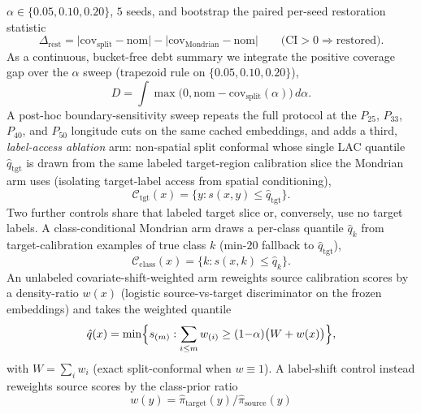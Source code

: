 \documentclass[preprint,11pt,authoryear]{elsarticle}
\begin{document}
$\alpha\in\{0.05,0.10,0.20\}$, $5$ seeds, and bootstrap the paired per-seed restoration statistic
\begin{equation}
\label{eq:restoration}
\Delta_{\mathrm{rest}}
=\bigl|\mathrm{cov}_{\mathrm{split}}-\mathrm{nom}\bigr|
-\bigl|\mathrm{cov}_{\mathrm{Mondrian}}-\mathrm{nom}\bigr|
\qquad\bigl(\mathrm{CI}{>}0\Rightarrow\text{restored}\bigr).
\end{equation}
As a continuous, bucket-free debt summary we integrate the positive coverage gap over the $\alpha$ sweep
(trapezoid rule on $\{0.05,0.10,0.20\}$),
\begin{equation}
\label{eq:debt}
D=\int \max\bigl(0,\mathrm{nom}-\mathrm{cov}_{\mathrm{split}}(\alpha)\bigr)\,d\alpha.
\end{equation}
A post-hoc boundary-sensitivity sweep repeats the full protocol at the
$P_{25}$, $P_{33}$, $P_{40}$, and $P_{50}$ longitude
cuts on the same cached embeddings, and adds a third, \emph{label-access ablation} arm: non-spatial split
conformal whose single LAC quantile $\hat q_{\mathrm{tgt}}$ is drawn from the same labeled target-region
calibration slice the Mondrian arm uses (isolating target-label access from spatial conditioning),
\begin{equation}
\label{eq:target-cal}
\mathcal{C}_{\mathrm{tgt}}(x)
=\bigl\{y:s(x,y)\le\hat q_{\mathrm{tgt}}\bigr\}.
\end{equation}
Two further controls share that labeled target slice or, conversely, use no target labels.
A class-conditional Mondrian arm draws a per-class quantile $\hat q_k$ from target-calibration examples of
true class $k$ (min-$20$ fallback to $\hat q_{\mathrm{tgt}}$),
\begin{equation}
\label{eq:class-mondrian}
\mathcal{C}_{\mathrm{class}}(x)
=\bigl\{k:s(x,k)\le\hat q_k\bigr\}.
\end{equation}
An unlabeled covariate-shift-weighted arm \citep{tibshirani2019covariate} reweights source calibration
scores by a density-ratio $w(x)$ (logistic source-vs-target discriminator on the frozen embeddings) and
takes the weighted quantile
\begin{equation}
\label{eq:weighted-cp}
\hat q(x)
=\min\Bigl\{s_{(m)}:\sum_{i\le m}w_{(i)}\ge(1{-}\alpha)\bigl(W+w(x)\bigr)\Bigr\},
\end{equation}
with $W=\sum_i w_i$ (exact split-conformal when $w\equiv 1$). A label-shift control
\citep{podkopaev2021labelshift} instead reweights source scores by the class-prior ratio
\begin{equation}
\label{eq:labelshift-w}
w(y)=\hat\pi_{\mathrm{target}}(y)/\hat\pi_{\mathrm{source}}(y)
\end{equation}
\end{document}
